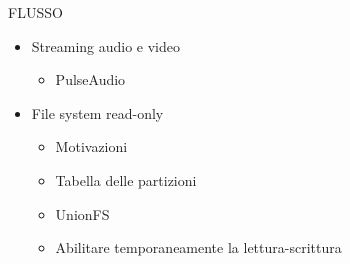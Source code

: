 \documentclass{beamer}
\begin{document}
\begin{frame}[fragile]{FLUSSO}
 \begin{itemize}
   \setlength\itemsep{2em}
     \item Streaming audio e video
     \vspace{0.5em}
        \begin{itemize}
           \setlength\itemsep{0.5em}
        \item PulseAudio
        \end{itemize}
     \item File system read-only
     \vspace{0.5em}
        \begin{itemize}
        \setlength\itemsep{0.5em}
        \item Motivazioni
        \item Tabella delle partizioni
        \item UnionFS
        \item Abilitare temporaneamente la lettura-scrittura
        \end{itemize}

 \end{itemize}
\end{frame}
\end{document}

